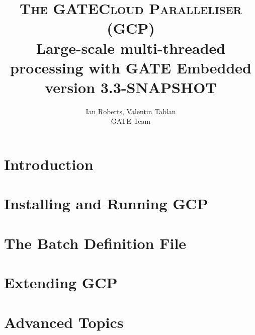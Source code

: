 \documentclass[10pt, a4paper, twoside]{report}
\begin{document}
\title{{\Huge {\textsc{The GATECloud Paralleliser (GCP)}}}\\
Large-scale multi-threaded processing with GATE Embedded \\
{\small version 3.3-SNAPSHOT}
}
\author{Ian Roberts, Valentin Tablan\\GATE Team}

\thispagestyle{empty}
\maketitle


\clearpage

\setcounter{tocdepth}{2}
\tableofcontents

\thispagestyle{empty}
\cleardoublepage

\pagestyle{fancy}
\fancyhead{} %

\chapter{Introduction}\label{chap:intro}


\chapter{Installing and Running GCP}\label{chap:install}


\chapter{The Batch Definition File}\label{chap:batch-def}


\chapter{Extending GCP}\label{chap:extending}


\chapter{Advanced Topics}\label{chap:advanced}

\end{document}
